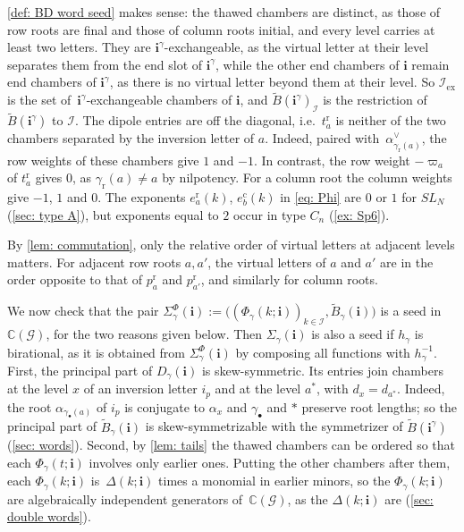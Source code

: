 \documentclass[a4paper]{amsart}
\numberwithin{equation}{section}
\theoremstyle{definition}
\theoremstyle{remark}
\newcommand{\bbC}{\mathbb{C}}
\newcommand{\mcG}{\mathcal{G}}
\newcommand{\mcI}{\mathcal{I}}
\newcommand{\bfi}{\mathbf{i}}
\newcommand{\tB}{\widetilde{B}}
\newcommand{\rr}{\mathrm{r}}
\newcommand{\cc}{\mathrm{c}}
\newcommand{\ex}{\mathrm{ex}}
\begin{document}
\cref{def: BD word seed} makes sense: the thawed chambers are distinct, as those of row roots are final and those of column roots initial, and every level carries at least two letters.
They are $\bfi^\gamma$-exchangeable, as the virtual letter at their level separates them from the end slot of $\bfi^\gamma$, while the other end chambers of $\bfi$ remain end chambers of $\bfi^\gamma$, as there is no virtual letter beyond them at their level.
So $\mcI_\ex$ is the set of~$\bfi^\gamma$-exchangeable chambers of $\bfi$, and $\tB(\bfi^\gamma)_\mcI$ is the restriction of $\tB(\bfi^\gamma)$ to $\mcI$.
The dipole entries are off the diagonal, i.e.\ $t^\rr_a$ is neither of the two chambers separated by the inversion letter of $a$.
Indeed, paired with~$\alpha^\vee_{\gamma_{\rr}(a)}$, the row weights of these chambers give $1$ and $-1$.
In contrast, the row weight $-\varpi_a$ of $t^\rr_a$ gives $0$, as $\gamma_{\rr}(a)\neq a$ by nilpotency.
For a column root the column weights give $-1$, $1$ and $0$.
The exponents $e^\rr_a(k)$, $e^\cc_b(k)$ in \eqref{eq: Phi} are $0$ or $1$ for $SL_N$ (\cref{sec: type A}), but exponents equal to $2$ occur in type $C_n$ (\cref{ex: Sp6}).

By \cref{lem: commutation}, only the relative order of virtual letters at adjacent levels matters.
For adjacent row roots $a,a'$, the virtual letters of $a$ and $a'$ are in the order opposite to that of $p^\rr_a$ and $p^\rr_{a'}$, and similarly for column roots.

We now check that the pair $\Sigma^\Phi_\gamma(\bfi):=\big((\Phi_\gamma(k;\bfi))_{k\in\mcI},\tB_\gamma(\bfi)\big)$ is a seed in $\bbC(\mcG)$, for the two reasons given below.
Then $\Sigma_\gamma(\bfi)$ is also a seed if $h_\gamma$ is birational, as it is obtained from $\Sigma^\Phi_\gamma(\bfi)$ by composing all functions with $h_\gamma^{-1}$.
First, the principal part of $D_\gamma(\bfi)$ is skew-symmetric.
Its entries join chambers at the level $x$ of an inversion letter $i_p$ and at the level $a^*$, with $d_x=d_{a^*}$.
Indeed, the root $\alpha_{\gamma_\bullet(a)}$ of $i_p$ is conjugate to $\alpha_x$ and $\gamma_\bullet$ and $*$ preserve root lengths; so the principal part of $\tB_\gamma(\bfi)$ is skew-symmetrizable with the symmetrizer of $\tB(\bfi^\gamma)$ (\cref{sec: words}).
Second, by \cref{lem: tails} the thawed chambers can be ordered so that each $\Phi_\gamma(t;\bfi)$ involves only earlier ones.
Putting the other chambers after them, each $\Phi_\gamma(k;\bfi)$ is~$\Delta(k;\bfi)$ times a monomial in earlier minors, so the $\Phi_\gamma(k;\bfi)$ are algebraically independent generators of~$\bbC(\mcG)$, as the $\Delta(k;\bfi)$ are (\cref{sec: double words}).
\end{document}
